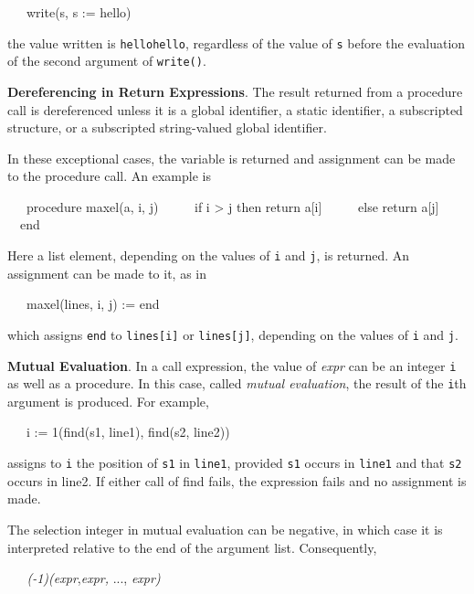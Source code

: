 {\ttfamily\mdseries
\ \ \ write(s, s := {\textquotedbl}hello{\textquotedbl})}

\noindent the value written is \texttt{hellohello}, regardless of the
value of \texttt{s} before the evaluation of the second argument of
\texttt{write()}.


\textbf{Dereferencing in Return Expressions}. The result returned from
a procedure call is dereferenced unless it is a global identifier, a
static identifier, a subscripted structure, or a subscripted
string-valued global identifier.

In these exceptional cases, the variable is returned and assignment
can be made to the procedure call. An example is

{\ttfamily\mdseries
\ \ \ procedure maxel(a, i, j)\newline
 \ \ \ \ \ if i {\textgreater} j then return a[i]\newline
 \ \ \ \ \ else return a[j]\newline
 \ \ end}

Here a list element, depending on the values of \texttt{i} and
\texttt{j}, is returned. An assignment can be made to it, as in

{\ttfamily\mdseries
\ \ \ maxel(lines, i, j) := {\textquotedbl}end{\textquotedbl}}

\noindent which assigns \texttt{{\textquotedbl}end{\textquotedbl}} to
\texttt{lines[i]} or \texttt{lines[j]}, depending on the values of
\texttt{i} and \texttt{j}.


\textbf{Mutual Evaluation}. In a call expression, the value of
\textit{expr}\textit{} can be an integer
\texttt{i} as well as a procedure. In this case, called
\textit{mutual evaluation}, the result of the \texttt{i}th
argument is produced. For example,

{\ttfamily\mdseries
\ \ \ i := 1(find(s1, line1), find(s2, line2))}

\noindent assigns to \texttt{i} the position of \texttt{s1} in
\texttt{line1}, provided \texttt{s1} occurs in \texttt{line1} and that
\texttt{s2} occurs in line2. If either call of find fails, the
expression fails and no assignment is made.

The selection integer in mutual evaluation can be negative, in which
case it is interpreted relative to the end of the argument
list. Consequently,

{\ttfamily\mdseries
\textit{\ \ \ (-1)(expr},\textit{expr}\textit{, }...,
\textit{expr}\textit{)}}

